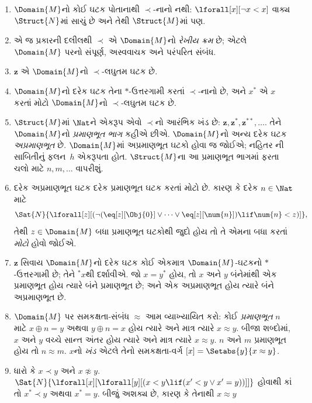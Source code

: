 \begin{enumerate}
\item $\Domain{M}$નો કોઈ ઘટક
  પોતાનાથી $\prec$-નાનો નથી:
  $\lforall[x][\lnot x < x]$
  વાક્ય $\Struct{N}$માં સાચું
  છે અને તેથી $\Struct{M}$માં પણ.
\item એ જ પ્રકારની દલીલથી
  $\prec$ એ $\Domain{M}$નો
  \emph{રેખીય ક્રમ} છે; એટલે
  $\Domain{M}$ પરનો સંપૂર્ણ,
  અસ્વવાચક અને પરંપરિત સંબંધ.
\item $\mathbf{z}$ એ
  $\Domain{M}$નો $\prec$-લઘુતમ
  ઘટક છે.
\item $\Domain{M}$નો દરેક
  ઘટક તેના $*$-ઉત્તરગામી
  કરતાં $\prec$-નાનો છે,
  અને $x^*$ એ $x$ કરતાં
  મોટો $\Domain{M}$નો
  $\prec$-લઘુતમ ઘટક છે.
\item $\Struct{M}$માં
  $\Nat$ને એકરૂપ એવો
  $\prec$નો આરંભિક ખંડ છે:
  $\mathbf{z}, \mathbf{z}^*, \mathbf{z}^{**}, \dots$.
  તેને $\Domain{M}$નો
  \emph{પ્રમાણભૂત ભાગ}
  કહીએ છીએ. $\Domain{M}$નો
  અન્ય દરેક ઘટક
  \emph{અપ્રમાણભૂત} છે.
  $\Domain{M}$માં અપ્રમાણભૂત
  ઘટકો હોવા જ
  જોઈએ; નહિતર
  ની
  સાબિતીનું ફલન~$h$
  એકરૂપતા હોત.
  $\Struct{M}$ના આ પ્રમાણભૂત
  ભાગમાં ફરતા ચલો
  માટે $n, m, \dots$
  વાપરીશું.
\item દરેક અપ્રમાણભૂત
  ઘટક દરેક પ્રમાણભૂત
  ઘટક કરતાં મોટો છે.
  કારણ કે દરેક
  $n \in \Nat$ માટે
  \[
  \Sat{N}{\lforall[z][(\lnot(\eq[z][\Obj{0}] \lor
  \dots \lor \eq[z][\num{n}]) \lif \num{n} < z)]},
  \]
  તેથી $z \in \Domain{M}$
  બધા પ્રમાણભૂત ઘટકોથી
  જુદો હોય તો તે
  એમના બધા કરતાં
  \emph{મોટો} હોવો જોઈએ.
\item $\mathbf{z}$ સિવાય
  $\Domain{M}$નો દરેક
  ઘટક કોઈ એકમાત્ર
  $\Domain{M}$-ઘટકનો
  $*$-ઉત્તરગામી છે;
  તેને $^*x$થી દર્શાવીએ.
  જો $x = y^*$ હોય,
  તો $x$ અને $y$
  બંનેમાંથી એક
  પ્રમાણભૂત હોય ત્યારે
  બંને પ્રમાણભૂત છે;
  અને એક અપ્રમાણભૂત
  હોય ત્યારે બંને
  અપ્રમાણભૂત છે.
\item $\Domain{M}$ પર
  સમકક્ષતા-સંબંધ
  $\approx$ આમ
  વ્યાખ્યાયિત કરો:
  કોઈ \emph{પ્રમાણભૂત}
  $n$ માટે $x \oplus n = y$
  અથવા $y \oplus n =x$
  હોય ત્યારે અને માત્ર
  ત્યારે $x \approx y$.
  બીજા શબ્દોમાં,
  $x$ અને $y$ વચ્ચે
  સાન્ત અંતર હોય
  ત્યારે અને માત્ર
  ત્યારે $x \approx y$.
  $n$ અને $m$
  પ્રમાણભૂત હોય તો
  $n \approx m$.
  $x$નો \emph{ખંડ}
  એટલે તેનો સમકક્ષતા-વર્ગ
  $[x] = \Setabs{y}{x
  \approx y}$.
\item ધારો કે $x \prec y$
  અને $x \not\approx y$.
  $\Sat{N}{\lforall[x][\lforall[y][(x < y \lif (x' < y \lor x' =
      y))]]}$ હોવાથી કાં તો
  $x^* \prec y$ અથવા
  $x^* = y$. બીજું
  અશક્ય છે, કારણ કે
  તેનાથી $x \approx y$

\end{enumerate}
